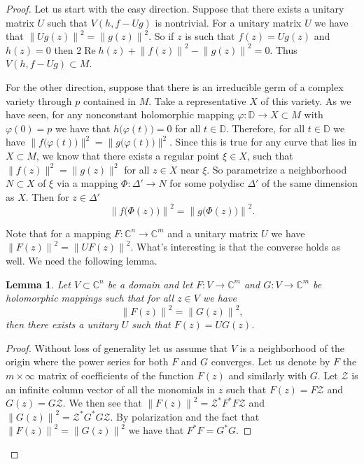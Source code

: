 \documentclass[12pt,openany]{book}
\renewcommand{\Re}{\operatorname{Re}}
\newcommand{\snorm}[1]{\lVert {#1} \rVert}
\newcommand{\norm}[1]{\left\lVert {#1} \right\rVert}
\newcommand{\C}{{\mathbb{C}}}
\newcommand{\bD}{{\mathbb{D}}}
\newcommand{\sZ}{{\mathcal{Z}}}
\theoremstyle{plain}
\newtheorem{lemma}[thm]{Lemma}
\theoremstyle{remark}
\theoremstyle{definition}
\theoremstyle{exercise}
\theoremstyle{example}
\begin{document}
\begin{proof}
Let us start with the easy direction.  Suppose that there
exists a unitary matrix $U$ such that $V(h,f-Ug)$ is
nontrivial.  For a unitary matrix $U$
we have that $\norm{Ug(z)}^2 = \norm{g(z)}^2$.  So if $z$
is such that $f(z) = Ug(z)$ and $h(z) = 0$ then
$2 \Re h(z) + \norm{f(z)}^2-\norm{g(z)}^2 = 0$.  Thus $V(h,f-Ug) \subset M$.

For the other direction, suppose that there is an irreducible germ of
a complex variety through $p$ contained in $M$.  Take a representative
$X$ of this variety.
As we have seen, for
any 
nonconstant holomorphic mapping
$\varphi \colon \bD \to X \subset M$
with $\varphi(0) = p$
we have that
$h\bigl(\varphi(t)\bigr) = 0$ for all $t \in \bD$.  Therefore,
for all $t \in \bD$ we have
$\snorm{f\bigl(\varphi(t)\bigr)}^2 = \snorm{g\bigl(\varphi(t)\bigr)}^2$.
Since this is true for any curve that lies in $X \subset M$, we know that
there exists a regular point $\xi \in X$, such that 
$\snorm{f(z)}^2 = \snorm{g(z)}^2$ for all $z \in X$ near $\xi$.
So parametrize a neighborhood $N \subset X$ of $\xi$ via a
mapping $\Phi \colon \Delta' \to N$ for some polydisc $\Delta'$ of
the same dimension as $X$.  Then for $z \in \Delta'$
\begin{equation}
\norm{f\bigl(\Phi(z)\bigr)}^2 = \norm{g\bigl(\Phi(z)\bigr)}^2 .
\end{equation}

Note that for a mapping $F \colon \C^n \to \C^m$ and
a unitary matrix $U$ we have
$\norm{F(z)}^2 = \norm{U F(z)}^2$.  What's interesting is that
the converse holds as well.  We need the following lemma.

\begin{lemma}
Let $V \subset \C^n$ be a domain and
let $F \colon V \to \C^m$ and
$G \colon V \to \C^m$ be holomorphic mappings such that
for all $z \in V$ we have
\begin{equation}
\norm{F(z)}^2 = \norm{G(z)}^2 ,
\end{equation}
then there exists a unitary $U$ such that $F(z) = U G (z)$.
\end{lemma}

\begin{proof}
Without loss of generality let us assume that $V$ is a neighborhood
of the origin where the power series for both $F$ and $G$ converges.
Let us denote by $F$ the $m \times \infty$ matrix of coefficients
of the function $F(z)$ and similarly with $G$.  
Let $\sZ$ is an infinite column vector of all the monomials in $z$
such that $F(z) = F \sZ$ and
$G(z) = G \sZ$.  We then see that
$\norm{F(z)}^2 = \sZ^* F^* F \sZ$
and
$\norm{G(z)}^2 = \sZ^* G^* G \sZ$.  By polarization and the fact that
$\norm{F(z)}^2 = \norm{G(z)}^2$ we have that
$F^*F = G^*G$.


\end{proof}
\end{proof}
\end{document}
